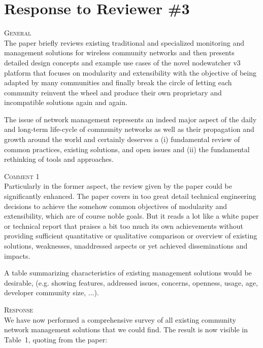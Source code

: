 \documentclass[12pt,twoside,a4paper]{report}
\begin{document}
\newpage

\section*{Response to Reviewer \#3}

\vspace{0.5cm}\noindent\textsc{General}\\
The paper briefly reviews existing traditional and specialized monitoring and management solutions for wireless community networks and then presents detailed design concepts and example use cases of the novel nodewatcher v3 platform that focuses on modularity and extensibility with the objective of being adapted by many communities and finally break the circle of letting each community reinvent the wheel and produce their own proprietary and incompatible solutions again and again.

The issue of network management represents an indeed major aspect of the daily and long-term life-cycle of community networks as well as their propagation and growth around the world and certainly deserves a (i) fundamental review of common practices, existing solutions, and open issues and (ii) the fundamental rethinking of tools and approaches.

\vspace{0.5cm}\noindent\textsc{Comment 1}\\
Particularly in the former aspect, the review given by the paper could be significantly enhanced. The paper covers in too great detail technical engineering decisions to achieve the somehow common objectives of modularity and extensibility, which are of course noble goals. But it reads a lot like a white paper or technical report that praises a bit too much its own achievements without providing sufficient quantitative or qualitative comparison or overview of existing solutions, weaknesses, unaddressed aspects or yet achieved disseminations and impacts.

A table summarizing characteristics of existing management solutions would be desirable, (e.g. showing features, addressed issues, concerns, openness, usage, age, developer community size, ...).

\vspace{0.5cm}\noindent\textsc{Response}\\
We have now performed a comprehensive survey of all existing community network management solutions that we could find.
The result is now visible in Table~1, quoting from the paper:
\end{document}
